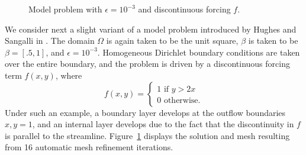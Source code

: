 \documentclass[final,leqno]{siamltex}
\newcommand{\nor}[1]{\left\| #1 \right\|}
\begin{document}
\begin{figure}[!h]
\centering
{}
\caption{Model problem with $\epsilon = 10^{-3}$ and discontinuous forcing $f$.}
\label{fig:discForcing}
\end{figure}
We consider next a slight variant of a model problem introduced by Hughes and Sangalli in \cite{HughesVMS}.  The domain $\Omega$ is again taken to be the unit square, $\beta$ is taken to be $\beta = [.5,1]$, and $\epsilon = 10^{-3}$.  Homogeneous Dirichlet boundary conditions are taken over the entire boundary, and the problem is driven by a discontinuous forcing term $f(x,y)$, where
\[
f(x,y) = \begin{cases}
1 \text{ if } y > 2x \\
0 \text{ otherwise}.
\end{cases}
\]
Under such an example, a boundary layer develops at the outflow boundaries $x,y = 1$, and an internal layer develops due to the fact that the discontinuity in $f$ is parallel to the streamline.  Figure~\ref{fig:discForcing} displays the solution and mesh resulting from 16 automatic mesh refinement iterations.  
%
\end{document}
